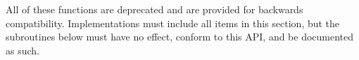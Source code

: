 All of these functions are deprecated and are provided for backwards
compatibility. 
Implementations must include all items in this section, 
but the subroutines below must have no effect, 
conform to this API, and be documented as such.

